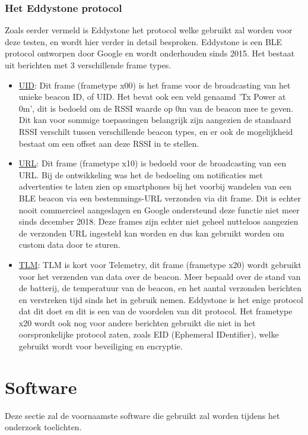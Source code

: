 \subsubsection{Het Eddystone protocol}
Zoals eerder vermeld is Eddystone het protocol welke gebruikt zal worden voor deze testen, en wordt hier verder in detail besproken. Eddystone is een BLE protocol ontworpen door Google en wordt onderhouden sinds 2015. Het bestaat uit berichten met 3 verschillende frame types. 
\begin{itemize}
	\item \underline{UID}:
	Dit frame (frametype x00) is het frame voor de broadcasting van het unieke beacon ID, of UID. Het bevat ook een veld genaamd 'Tx Power at 0m', dit is bedoeld om de RSSI waarde op 0m van de beacon mee te geven. Dit kan voor sommige toepassingen belangrijk zijn aangezien de standaard RSSI verschilt tussen verschillende beacon types, en er ook de mogelijkheid bestaat om een offset aan deze RSSI in te stellen.
	\item \underline{URL}:
	Dit frame (frametype x10) is bedoeld voor de broadcasting van een URL. Bij de ontwikkeling was het de bedoeling om notificaties met advertenties te laten zien op smartphones bij het voorbij wandelen van een BLE beacon via een bestemmings-URL verzonden via dit frame. Dit is echter nooit commercieel aangeslagen en Google ondersteund deze functie niet meer sinds december 2018.\autocite{Estimote2018} Deze frames zijn echter niet geheel nutteloos aangezien de verzonden URL ingesteld kan worden en dus kan gebruikt worden om custom data door te sturen.
	\item \underline{TLM}:
	TLM is kort voor Telemetry, dit frame (frametype x20) wordt gebruikt voor het verzenden van data over de beacon. Meer bepaald over de stand van de batterij, de temperatuur van de beacon, en het aantal verzonden berichten en verstreken tijd sinds het in gebruik nemen. Eddystone is het enige protocol dat dit doet en dit is een van de voordelen van dit protocol. Het frametype x20 wordt ook nog voor andere berichten gebruikt die niet in het oorspronkelijke protocol zaten, zoals EID (Ephemeral IDentifier), welke gebruikt wordt voor beveiliging en encryptie.
\end{itemize}\autocite{Google2018}

\section{Software}
\label{sec:lit-software}
Deze sectie zal de voornaamste software die gebruikt zal worden tijdens het onderzoek toelichten.

